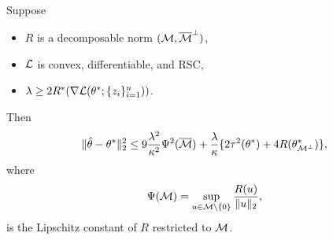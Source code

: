 \begin{thm}
Suppose
\begin{itemize}
    \item $R$ is a decomposable norm \wrt $(\mathcal{M}, {\overline{\mathcal{M}}}^\perp)$,
    \item $\mathcal{L}$ is convex, differentiable, and RSC,
    \item $\lambda\ge 2R^*(\nabla\mathcal{L}(\theta^*;\{z_i\}_{i=1}^n))$.
\end{itemize}
Then
\begin{equation}
    \|{\hat{\theta}}-\theta^*\|_2^2\le 9\frac{\lambda^2}{\kappa^2}\Psi^2({\overline{\mathcal{M}}})
        + \frac{\lambda}{\kappa}\{2\tau^2(\theta^*)+4R(\theta^*_{\mathcal{M}^\perp})\},
\end{equation}
where
\begin{equation}
    \Psi(\mathcal{M})=\sup_{u\in\mathcal{M}\backslash\{0\}}\frac{R(u)}{\|u\|_2},
\end{equation}
is the Lipschitz constant of $R$ restricted to $\mathcal{M}$.
\end{thm}

